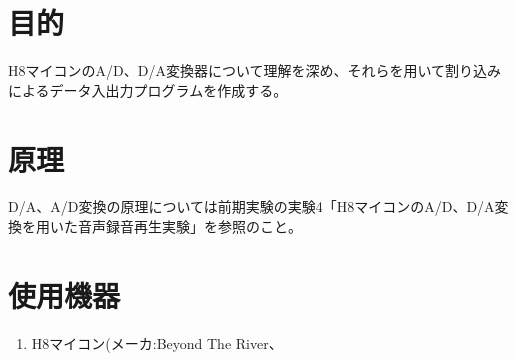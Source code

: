 \documentclass{jarticle}
\begin{document}
\section{目的}
H8マイコンのA/D、D/A変換器について理解を深め、それらを用いて割り込みによるデータ入出力プログラムを作成する。

\section{原理}
D/A、A/D変換の原理については前期実験の実験4「H8マイコンのA/D、D/A変換を用いた音声録音再生実験」を参照のこと。

\section{使用機器}
\begin{enumerate}
\item H8マイコン(メーカ:Beyond The River、
\end{enumerate}
\end{document}
